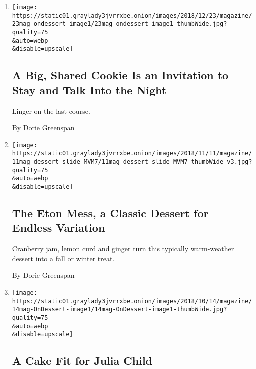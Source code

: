 \begin{enumerate}
\def\labelenumi{\arabic{enumi}.}
\item
  \href{/2018/12/20/magazine/big-spice-cookie-share.html}{}

  \texttt{[image: https://static01.graylady3jvrrxbe.onion/images/2018/12/23/magazine/23mag-ondessert-image1/23mag-ondessert-image1-thumbWide.jpg?quality=75\\\&auto=webp\\\&disable=upscale]}

  \hypertarget{a-big-shared-cookie-is-an-invitation-to-stay-and-talk-into-the-night}{%
  \subsection{A Big, Shared Cookie Is an Invitation to Stay and Talk
  Into the
  Night}\label{a-big-shared-cookie-is-an-invitation-to-stay-and-talk-into-the-night}}

  Linger on the last course.

  By Dorie Greenspan
\item
  \href{/2018/11/06/magazine/eton-mess-dessert-fall-winter.html}{}

  \texttt{[image: https://static01.graylady3jvrrxbe.onion/images/2018/11/11/magazine/11mag-dessert-slide-MVM7/11mag-dessert-slide-MVM7-thumbWide-v3.jpg?quality=75\\\&auto=webp\\\&disable=upscale]}

  \hypertarget{the-eton-mess-a-classic-dessert-for-endless-variation}{%
  \subsection{The Eton Mess, a Classic Dessert for Endless
  Variation}\label{the-eton-mess-a-classic-dessert-for-endless-variation}}

  Cranberry jam, lemon curd and ginger turn this typically warm-weather
  dessert into a fall or winter treat.

  By Dorie Greenspan
\item
  \href{/2018/10/10/magazine/chocolate-cake-julia-child.html}{}

  \texttt{[image: https://static01.graylady3jvrrxbe.onion/images/2018/10/14/magazine/14mag-OnDessert-image1/14mag-OnDessert-image1-thumbWide.jpg?quality=75\\\&auto=webp\\\&disable=upscale]}

  \hypertarget{a-cake-fit-for-julia-child}{%
  \subsection{A Cake Fit for Julia
  Child}\label{a-cake-fit-for-julia-child}}


\end{enumerate}
